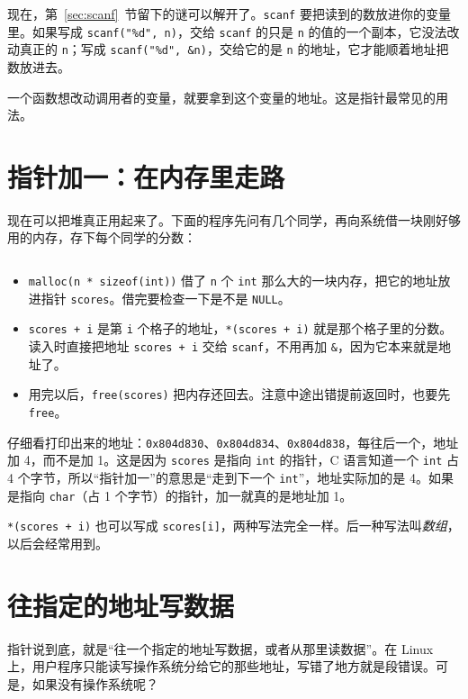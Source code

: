 现在，第~\ref{sec:scanf}~节留下的谜可以解开了。\texttt{scanf} 要把读到的数放进你的变量里。如果写成 \texttt{scanf("\%d", n)}，交给 \texttt{scanf} 的只是 \texttt{n} 的值的一个副本，它没法改动真正的 \texttt{n}；写成 \texttt{scanf("\%d", \&n)}，交给它的是 \texttt{n} 的地址，它才能顺着地址把数放进去。

一个函数想改动调用者的变量，就要拿到这个变量的地址。这是指针最常见的用法。

\section{指针加一：在内存里走路}
\label{sec:heap-pointer}

现在可以把堆真正用起来了。下面的程序先问有几个同学，再向系统借一块刚好够用的内存，存下每个同学的分数：


\inputminted[linenos=false]{text}{code/ch04/out/heap.txt}

\begin{itemize}
  \item \texttt{malloc(n * sizeof(int))} 借了 \texttt{n} 个 \texttt{int} 那么大的一块内存，把它的地址放进指针 \texttt{scores}。借完要检查一下是不是 \texttt{NULL}。
  \item \texttt{scores + i} 是第 \texttt{i} 个格子的地址，\texttt{*(scores + i)} 就是那个格子里的分数。读入时直接把地址 \texttt{scores + i} 交给 \texttt{scanf}，不用再加 \texttt{\&}，因为它本来就是地址了。
  \item 用完以后，\texttt{free(scores)} 把内存还回去。注意中途出错提前返回时，也要先 \texttt{free}。
\end{itemize}

仔细看打印出来的地址：\texttt{0x804d830}、\texttt{0x804d834}、\texttt{0x804d838}，每往后一个，地址加 4，而不是加 1。这是因为 \texttt{scores} 是指向 \texttt{int} 的指针，C 语言知道一个 \texttt{int} 占 4 个字节，所以“指针加一”的意思是“走到下一个 \texttt{int}”，地址实际加的是 4。如果是指向 \texttt{char}（占 1 个字节）的指针，加一就真的是地址加 1。

\texttt{*(scores + i)} 也可以写成 \texttt{scores[i]}，两种写法完全一样。后一种写法叫\emph{数组}，以后会经常用到。

\section{往指定的地址写数据}
\label{sec:mmio}

指针说到底，就是“往一个指定的地址写数据，或者从那里读数据”。在 Linux 上，用户程序只能读写操作系统分给它的那些地址，写错了地方就是段错误。可是，如果没有操作系统呢？

